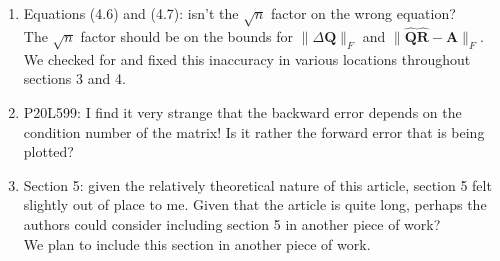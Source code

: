 \documentclass[10pt]{article}
\newcommand{\bb}[1]{\mathbf{#1}}
\begin{document}
\begin{enumerate}
{	}
	\item Equations (4.6) and (4.7): isn't the $\sqrt{n}$ factor on the wrong equation?\\
	{\normalfont
		The $\sqrt{n}$ factor should be on the bounds for $\|\Delta\bb{Q}\|_F$ and $\|\hat{\bb{Q}}\hat{\bb{R}}-\bb{A}\|_F$.
		We checked for and fixed this inaccuracy in various locations throughout sections 3 and 4. 
	}
%		
%		
	\item P20L599: I find it very strange that the backward error depends on the condition number of the matrix! Is it rather the forward error that is being plotted?\\
	{\normalfont
	
	}
	\item Section 5: given the relatively theoretical nature of this article, section 5 felt slightly out of place to me. Given that the article is quite long, perhaps the authors could consider including section 5 in another piece of work? \\
	{\normalfont We plan to include this section in another piece of work.}
	
\end{enumerate}


\end{document}
